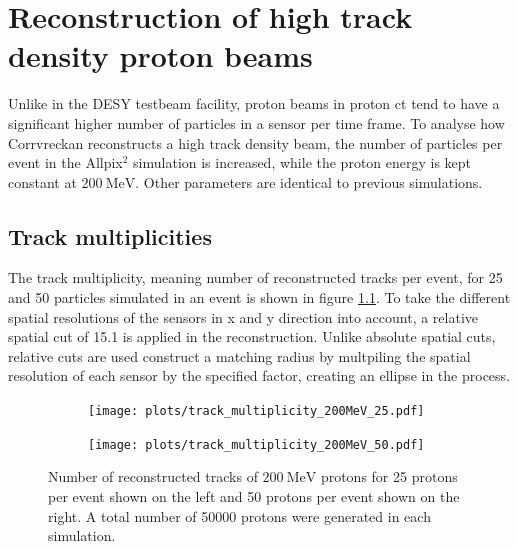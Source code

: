 \chapter{Reconstruction of high track density proton beams}\label{sec:density}
Unlike in the DESY testbeam facility, proton beams in proton ct tend to have a significant higher number of particles in a sensor
per time frame. To analyse how Corrvreckan reconstructs a high track density beam, the number of particles per event in the Allpix$^2$
simulation is increased, while the proton energy is kept constant at $\SI{200}{\mega\eV}$. Other parameters are identical to previous simulations.

\section{Track multiplicities}
The track multiplicity, meaning number of reconstructed tracks per event, for 25 and 50 particles simulated in an event is shown in figure \ref{fig:multiplicity}. To take the different spatial resolutions of the sensors in x and y direction into account, a relative
spatial cut of 15.1 is applied in the reconstruction. Unlike absolute spatial cuts, relative cuts are used construct a
matching radius by multpiling the spatial resolution
of each sensor by the specified factor, creating an ellipse in the process.

\begin{figure}
  \hspace{-2.5cm}
  \begin{subfigure}{0.62\textwidth}
      \centering
      \texttt{[image: plots/track\_multiplicity\_200MeV\_25.pdf]}
  \end{subfigure}
  \begin{subfigure}{0.62\textwidth}
      \hspace{0.95cm}
      \texttt{[image: plots/track\_multiplicity\_200MeV\_50.pdf]}
  \end{subfigure}
  \caption{Number of reconstructed tracks of $\SI{200}{\mega\eV}$ protons for 25 protons per event shown on the left and
  50 protons per event shown on the right. A total number of 50000 protons were generated in each simulation. }
  \label{fig:multiplicity}
\end{figure}

